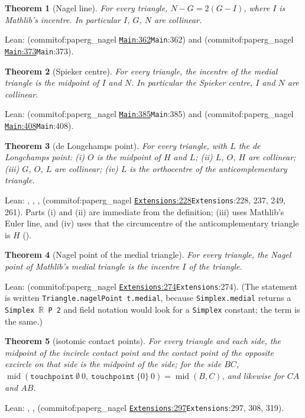 \documentclass[11pt]{article}
\newtheorem{theorem}{Theorem}
\theoremstyle{definition}
\theoremstyle{remark}
\newcommand{\lean}[1]{\texttt{#1}}
\newcommand{\commitof}[1]{\csname commitof:#1\endcsname}
\newcommand{\repo}[1]{https://github.com/jpbald93/#1}
\newcommand{\src}[4]{\ifcsname commitof:#1\endcsname
  \href{\repo{#1}/blob/\commitof{#1}/#2/#3.lean\#L#4}{\texttt{#3}:#4}\else\texttt{#3}:#4\fi}
\begin{document}
\begin{theorem}[Nagel line]\label{thm:nagelline}
For every triangle, $N-G=2(G-I)$, where $I$ is Mathlib's incentre. In particular $I$, $G$, $N$ are
collinear.
\end{theorem}
Lean:  (\src{paperg_nagel}{NagelLine}{Main}{362}) and
 (\src{paperg_nagel}{NagelLine}{Main}{373}).

\begin{theorem}[Spieker centre]\label{thm:spieker}
For every triangle, the incentre of the medial triangle is the midpoint of $I$ and $N$. In
particular the Spieker centre, $I$ and $N$ are collinear.
\end{theorem}
Lean:  (\src{paperg_nagel}{NagelLine}{Main}{385}) and
(\src{paperg_nagel}{NagelLine}{Main}{408}).

\begin{theorem}[de Longchamps point]\label{thm:delong}
For every triangle, with $L$ the de Longchamps point:
(i) $O$ is the midpoint of $H$ and $L$; (ii) $L$, $O$, $H$ are collinear; (iii) $G$, $O$, $L$ are
collinear; (iv) $L$ is the orthocentre of the anticomplementary triangle.
\end{theorem}
Lean: ,
,
,
(\src{paperg_nagel}{NagelLine}{Extensions}{228}, 237, 249, 261).
Parts (i) and (ii) are immediate from the definition; (iii) uses Mathlib's Euler line, and (iv) uses
that the circumcentre of the anticomplementary triangle is $H$
().

\begin{theorem}[Nagel point of the medial triangle]\label{thm:medialnagel}
For every triangle, the Nagel point of Mathlib's medial triangle is the incentre $I$ of the triangle.
\end{theorem}
Lean:  (\src{paperg_nagel}{NagelLine}{Extensions}{274}). (The
statement is written \lean{Triangle.nagelPoint t.medial}, because \lean{Simplex.medial} returns a
\lean{Simplex \(\mathbb{R}\) P 2} and field notation would look for a \lean{Simplex} constant; the term is
the same.)

\begin{theorem}[isotomic contact points]\label{thm:isotomic}
For every triangle and each side, the midpoint of the incircle contact point and the contact point
of the opposite excircle on that side is the midpoint of the side; for the side $BC$,
$\operatorname{mid}(\lean{touchpoint}\ \emptyset\ 0,\ \lean{touchpoint}\ \{0\}\ 0)=\operatorname{mid}(B,C)$,
and likewise for $CA$ and $AB$.
\end{theorem}
Lean: , ,
 (\src{paperg_nagel}{NagelLine}{Extensions}{297}, 308, 319).
\end{document}
